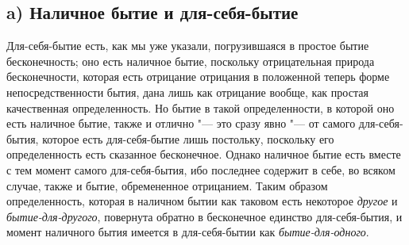 \subsection*{a) Наличное бытие и для-себя-бытие}
Для-себя-бытие есть, как мы уже указали, погрузившаяся в простое бытие
бесконечность; оно есть наличное бытие, поскольку отрицательная природа
бесконечности, которая есть отрицание отрицания в положенной теперь форме
непосредственности бытия, дана лишь как отрицание вообще, как простая
качественная определенность. Но бытие в такой определенности, в которой оно
есть наличное бытие, также и отлично "--- это сразу явно "--- от самого
для-себя-бытия, которое есть для-себя-бытие лишь постольку, поскольку его
определенность есть сказанное бесконечное. Однако наличное бытие есть
вместе с тем момент самого для-себя-бытия, ибо последнее содержит в себе,
во всяком случае, также и бытие, обремененное отрицанием. Таким образом
определенность, которая в наличном бытии как таковом есть некоторое
{\em другое} и
{\em бытие-для-другого}, повернута обратно в
бесконечное единство для-себя-бытия, и момент наличного бытия имеется в
для-себя-бытии как {\em бытие-для-одного}.

